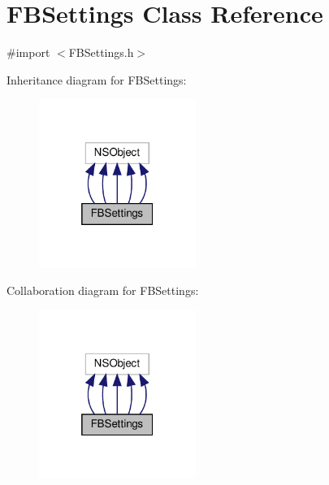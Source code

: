 \hypertarget{interfaceFBSettings}{}\section{F\+B\+Settings Class Reference}
\label{interfaceFBSettings}


{\ttfamily \#import $<$F\+B\+Settings.\+h$>$}



Inheritance diagram for F\+B\+Settings\+:
\nopagebreak
\begin{figure}[H]
\begin{center}
\leavevmode
\includegraphics[width=145pt]{interfaceFBSettings__inherit__graph}
\end{center}
\end{figure}


Collaboration diagram for F\+B\+Settings\+:
\nopagebreak
\begin{figure}[H]
\begin{center}
\leavevmode
\includegraphics[width=145pt]{interfaceFBSettings__coll__graph}
\end{center}
\end{figure}
